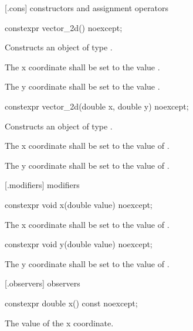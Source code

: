  [\vectortwod.cons] { constructors and assignment operators}

\begin{itemdecl}
constexpr vector_2d() noexcept;
\end{itemdecl}
\begin{itemdescr}
\pnum
\effects
Constructs an object of type .

\pnum
The x coordinate shall be set to the value .

\pnum
The y coordinate shall be set to the value .
\end{itemdescr}

\begin{itemdecl}
constexpr vector_2d(double x, double y) noexcept;
\end{itemdecl}
\begin{itemdescr}
\pnum
\effects
Constructs an object of type .

\pnum
The x coordinate shall be set to the value of .

\pnum
The y coordinate shall be set to the value of .
\end{itemdescr}

 [\vectortwod.modifiers]{ modifiers}

\begin{itemdecl}
constexpr void x(double value) noexcept;
\end{itemdecl}
\begin{itemdescr}
\pnum
\effects
The x coordinate shall be set to the value of .
\end{itemdescr}

\begin{itemdecl}
constexpr void y(double value) noexcept;
\end{itemdecl}
\begin{itemdescr}
\pnum
\effects
The y coordinate shall be set to the value of .
\end{itemdescr}

 [\vectortwod.observers]{ observers}

\begin{itemdecl}
constexpr double x() const noexcept;
\end{itemdecl}
\begin{itemdescr}
\pnum
\returns
The value of the x coordinate.
\end{itemdescr}


